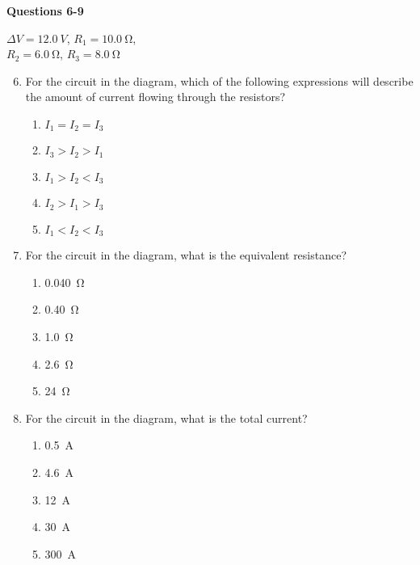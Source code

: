 \documentclass{../../oss-apphys}
\begin{document}
\begin{multicols}{2}
  \textbf{Questions 6-9}
  \begin{center}
    
    \vspace{.1in}$\Delta V=\SI{12.0}{V}$, $R_1=\SI{10.0}{\ohm}$,\\
    $R_2=\SI{6.0}{\ohm}$, $R_3=\SI{8.0}{\ohm}$
  \end{center}

  \begin{enumerate}[leftmargin=18pt]
    \setcounter{enumi}{5}

  \item For the circuit in the diagram, which of the following expressions will
    describe the amount of current flowing through the resistors?
    \begin{enumerate}[noitemsep,topsep=0pt,leftmargin=18pt,label=(\Alph*)]
    \item $I_1=I_2=I_3$
    \item $I_3>I_2>I_1$
    \item $I_1>I_2<I_3$
    \item $I_2>I_1>I_3$
    \item $I_1<I_2<I_3$
    \end{enumerate}
    
  \item For the circuit in the diagram, what is the equivalent resistance?
    \begin{enumerate}[noitemsep,topsep=0pt,leftmargin=18pt,label=(\Alph*)]
      \item\SI{0.040}{\ohm}
      \item\SI{0.40}{\ohm}
      \item\SI{1.0}{\ohm}
      \item\SI{2.6}{\ohm}
      \item\SI{24}{\ohm}
    \end{enumerate}
    
  \item For the circuit in the diagram, what is the total current?
    \begin{enumerate}[noitemsep,topsep=0pt,leftmargin=18pt,label=(\Alph*)]
    \item\SI{0.5}{A}
    \item\SI{4.6}{A}
    \item\SI{12}{A}
    \item\SI{30}{A}
    \item\SI{300}{A}
    \end{enumerate}
    

\end{enumerate}
\end{multicols}
\end{document}

